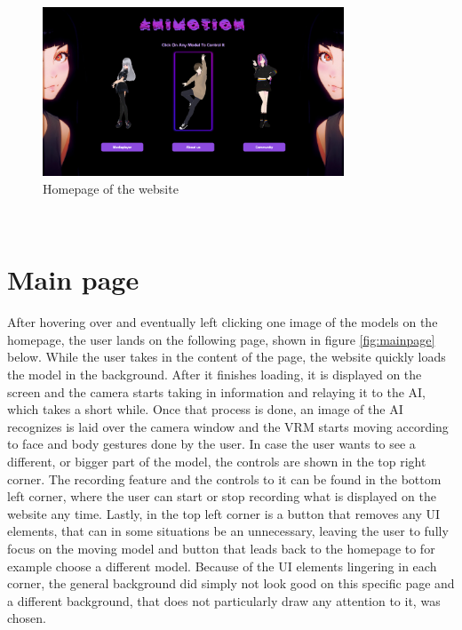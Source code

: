 \\
\begin{figure}[htb]
    \centering
    \includegraphics[width=0.8\textwidth]{pics/Animotion_homepage.png}
    \caption{Homepage of the website}
    \label{fig:homepage}
\end{figure}
\\

\section{Main page}
After hovering over and eventually left clicking one image of the models on the homepage,
the user lands on the following page, shown in figure \ref{fig:mainpage} below. While the user takes in
the content of the page, the website quickly loads the model in the background. After it
finishes loading, it is displayed on the screen and the camera starts taking in information
and relaying it to the AI, which takes a short while. Once that process is done, an image
of the AI recognizes is laid over the camera window and the VRM starts moving according
to face and body gestures done by the user. In case the user wants to see a different, or
bigger part of the model, the controls are shown in the top right corner. The recording
feature and the controls to it can be found in the bottom left corner, where the user can
start or stop recording what is displayed on the website any time. Lastly, in the top left
corner is a button that removes any UI elements, that can in some situations be an unnecessary,
leaving the user to fully focus on the moving model and button that leads back to the homepage
to for example choose a different model. Because of the UI elements lingering in each corner,
the general background did simply not look good on this specific page and a different background,
that does not particularly draw any attention to it, was chosen.

